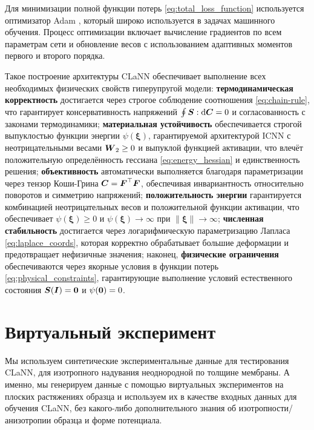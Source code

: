 Для минимизации полной функции потерь \eqref{eq:total_loss_function} используется оптимизатор Adam \cite{kingma2014adam}, 
который широко используется в задачах машинного обучения. 
Процесс оптимизации включает вычисление градиентов по всем параметрам сети и обновление весов 
с использованием адаптивных моментов первого и второго порядка.

Такое построение архитектуры CLaNN обеспечивает выполнение всех необходимых физических свойств гиперупругой модели: 
\textbf{термодинамическая корректность} достигается через строгое соблюдение соотношения \eqref{eq:chain-rule}, 
что гарантирует консервативность напряжений $\oint \boldsymbol{S}:\mathrm{d}\boldsymbol{C} = 0$ и согласованность с законами 
термодинамики; \textbf{материальная устойчивость} обеспечивается строгой выпуклостью функции энергии 
$\psi(\boldsymbol{\xi})$, гарантируемой архитектурой ICNN с неотрицательными весами $\boldsymbol{W}_2 \geq 0$ и 
выпуклой функцией активации, что влечёт положительную определённость гессиана \eqref{eq:energy_hessian} и 
единственность решения; \textbf{объективность} автоматически выполняется благодаря параметризации через тензор 
Коши-Грина $\boldsymbol{C} = \boldsymbol{F}^{\top}\boldsymbol{F}$, обеспечивая инвариантность относительно поворотов и симметрию напряжений; 
\textbf{положительность энергии} гарантируется комбинацией неотрицательных весов и положительной функции активации, 
что обеспечивает $\psi(\boldsymbol{\xi}) \geq 0$ и $\psi(\boldsymbol{\xi}) \to \infty$ при $\|\boldsymbol{\xi}\| 
\to \infty$; \textbf{численная стабильность} достигается через логарифмическую параметризацию Лапласа \eqref{eq:laplace_coords}, которая корректно обрабатывает большие деформации и предотвращает нефизичные значения; наконец, \textbf{физические ограничения} обеспечиваются через якорные условия в функции потерь \eqref{eq:physical_constraints}, гарантирующие выполнение условий естественного состояния $\boldsymbol{S}(\boldsymbol{I}) = \boldsymbol{0}$ и $\psi(\boldsymbol{0}) = 0$.



\section{Виртуальный эксперимент}

Мы используем синтетические экспериментальные данные для тестирования CLaNN, для изотропного надувания неоднородной по толщине мембраны. 
А именно, мы генерируем данные с помощью виртуальных экспериментов на плоских растяжениях образца и используем их в качестве входных данных для 
обучения CLaNN, без какого-либо дополнительного знания об изотропности/анизотропии образца и форме потенциала.
 
